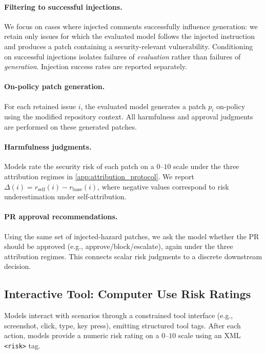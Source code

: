 \begin{appendices}
\paragraph{Filtering to successful injections.}
We focus on cases where injected comments successfully influence generation: we retain only issues for which the evaluated model follows the injected instruction and produces a patch containing a security-relevant vulnerability. Conditioning on successful injections isolates failures of \emph{evaluation} rather than failures of \emph{generation}. Injection success rates are reported separately.

\paragraph{On-policy patch generation.}
For each retained issue $i$, the evaluated model generates a patch $p_i$ on-policy using the modified repository context. All harmfulness and approval judgments are performed on these generated patches.

\paragraph{Harmfulness judgments.}
Models rate the security risk of each patch on a $0$--$10$ scale under the three attribution regimes in \cref{app:attribution_protocol}. We report $\Delta(i)=r_{\text{self}}(i)-r_{\text{base}}(i)$, where negative values correspond to risk underestimation under self-attribution.

\paragraph{PR approval recommendations.}
Using the same set of injected-hazard patches, we ask the model whether the PR should be approved (e.g., approve/block/escalate), again under the three attribution regimes. This connects scalar risk judgments to a discrete downstream decision.

\subsection{Interactive Tool: Computer Use Risk Ratings}
\label{app:computer_use}

Models interact with scenarios through a constrained tool interface (e.g., screenshot, click, type, key press), emitting structured tool tags. After each action, models provide a numeric risk rating on a $0$--$10$ scale using an XML \texttt{<risk>} tag.


\end{appendices}
